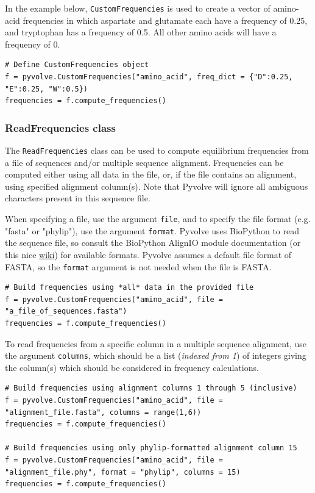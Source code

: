 \documentclass{article}
\newcommand{\code}[1]{\texttt{\small{#1}}}
\begin{document}
In the example below, \code{CustomFrequencies} is used to create a vector of amino-acid frequencies in which aspartate and glutamate each have a frequency of 0.25, and tryptophan has a frequency of 0.5. All other amino acids will have a frequency of 0.
\begin{lstlisting}
# Define CustomFrequencies object
f = pyvolve.CustomFrequencies("amino_acid", freq_dict = {"D":0.25, "E":0.25, "W":0.5})
frequencies = f.compute_frequencies()
\end{lstlisting}



\subsubsection{ReadFrequencies class}
The \code{ReadFrequencies} class can be used to compute equilibrium frequencies from a file of sequences and/or multiple sequence alignment. Frequencies can be computed either using all data in the file, or, if the file contains an alignment, using specified alignment column(s).
Note that Pyvolve will ignore all ambiguous characters present in this sequence file.

When specifying a file, use the argument \code{file}, and to specify the file format (e.g. "fasta" or "phylip"), use the argument \code{format}. Pyvolve uses BioPython to read the sequence file, so consult the BioPython AlignIO module documentation (or this nice \href{http://biopython.org/wiki/AlignIO}{wiki}) for available formats. Pyvolve assumes a default file format of FASTA, so the \code{format} argument is not needed when the file is FASTA.

\begin{lstlisting}
# Build frequencies using *all* data in the provided file
f = pyvolve.CustomFrequencies("amino_acid", file = "a_file_of_sequences.fasta")
frequencies = f.compute_frequencies()
\end{lstlisting}

To read frequencies from a specific column in a multiple sequence alignment, use the argument \code{columns}, which should be a list (\emph{indexed from 1}) of integers giving the column(s) which should be considered in frequency calculations.
\begin{lstlisting}
# Build frequencies using alignment columns 1 through 5 (inclusive)
f = pyvolve.CustomFrequencies("amino_acid", file = "alignment_file.fasta", columns = range(1,6))
frequencies = f.compute_frequencies()

# Build frequencies using only phylip-formatted alignment column 15
f = pyvolve.CustomFrequencies("amino_acid", file = "alignment_file.phy", format = "phylip", columns = 15)
frequencies = f.compute_frequencies()

\end{lstlisting}
\end{document}
